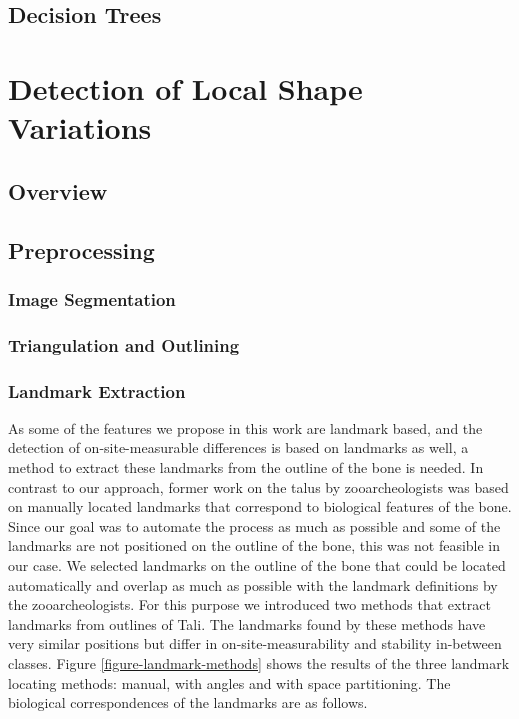 \documentclass[pdftex,12pt,a4paper]{report}
\begin{document}
\cite{pedregosa2011scikit}

\section{Decision Trees}

\chapter{Detection of Local Shape Variations}

\section{Overview}

\section{Preprocessing}

\subsection{Image Segmentation}

\cite{achanta2012slic}
\cite{felzenszwalb2004efficient}
\cite{houhou2009fast}
\cite{jain1990unsupervised}
\cite{haralick1973textural}

\subsection{Triangulation and Outlining}

\cite{akkirajualpha}

\subsection{Landmark Extraction}

As some of the features we propose in this work are landmark based, and the detection of on-site-measurable differences
is based on landmarks as well, a method to extract these landmarks from the outline of the bone is needed. In contrast to
our approach, former work on the talus by zooarcheologists was based on manually located landmarks that correspond to
biological features of the bone. Since our goal was to automate the process as much as possible and some of the landmarks
are not positioned on the outline of the bone, this was not feasible in our case. We selected landmarks on the outline
of the bone that could be located automatically and overlap as much as possible with the landmark definitions by the
zooarcheologists. For this purpose we introduced two methods that extract landmarks from outlines of Tali. The landmarks
found by these methods have very similar positions but differ in on-site-measurability and stability in-between classes.
Figure \ref{figure-landmark-methods} shows the results of the three landmark locating methods: manual, with angles and
with space partitioning. The biological correspondences of the landmarks are as follows.
\end{document}
